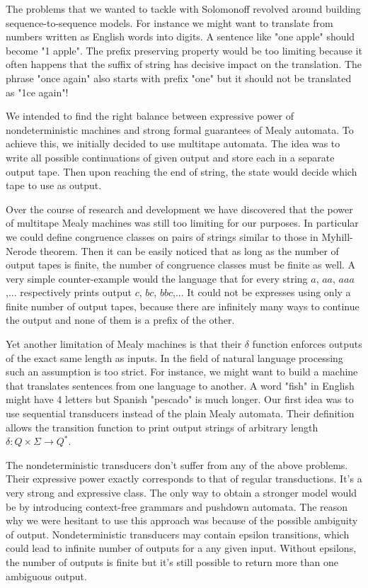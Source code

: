 The problems that we wanted to tackle with Solomonoff revolved around building sequence-to-sequence models. For instance we might want to translate from numbers written as English words into digits. A sentence like "one apple" should become "1 apple". The prefix preserving property would be too limiting because it often happens that the suffix of string has decisive impact on the translation. The phrase "once again"
also starts with prefix "one" but it should not be translated as "1ce again"!

We intended to find the right balance between expressive power of nondeterministic machines and strong formal guarantees of Mealy automata. To achieve this, we initially decided to use multitape automata. The idea was to write all possible continuations of given output and store each in a separate output tape. Then upon reaching the end of string, the state would decide which tape to use as output. 

Over the course of research and development we have discovered that the power of multitape Mealy machines was still too limiting for our purposes. In particular we could define congruence classes on pairs of strings similar to those in Myhill-Nerode theorem. Then it can be easily noticed that as long as the number of output tapes is finite, the number of congruence classes must be finite as well. A very simple counter-example would the language that for every string $a$, $aa$, $aaa$,... respectively prints output $c$, $bc$, $bbc$,... It could not be expresses using only a finite number of output tapes, because there are infinitely many ways to continue the output and none of them is a prefix of the other.  



Yet another limitation of Mealy machines is that their $\delta$ function enforces outputs of the exact same length as inputs. In the field of natural language processing such an assumption is too strict. For instance, we might want to 
build a machine that translates sentences from one language to another. A word "fish" in English might have 4 letters but Spanish "pescado" is much longer. Our first idea was to use sequential transducers instead of the plain Mealy automata. Their definition allows the transition function to print output strings of arbitrary length $\delta:Q\times \Sigma \rightarrow Q^*$. 


The nondeterministic transducers  don't suffer from any of the above problems. Their expressive power exactly corresponds to that of regular transductions. It's a very strong and expressive class. The only way to obtain a stronger model would be by introducing context-free grammars and pushdown automata. The reason why we were hesitant to use this approach was because of the possible ambiguity of output. Nondeterministic transducers may contain epsilon transitions, which could lead to infinite number of outputs for a any given input. Without epsilons, the number of outputs is finite but it's still possible to return more than one ambiguous output.


